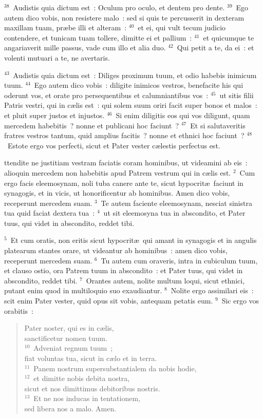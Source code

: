 ${}^{38}$~Audistis quia dictum est~: Oculum pro oculo, et dentem pro dente.
${}^{39}$~Ego autem dico vobis, non resistere malo~: sed si quis te percusserit in dexteram maxillam tuam, pr\ae be illi et alteram~:
${}^{40}$~et ei, qui vult tecum judicio contendere, et tunicam tuam tollere, dimitte ei et pallium~:
${}^{41}$~et quicumque te angariaverit mille passus, vade cum illo et alia duo.
${}^{42}$~Qui petit a te, da ei~: et volenti mutuari a te, ne avertaris.


${}^{43}$~Audistis quia dictum est~: Diliges proximum tuum, et odio habebis inimicum tuum.
${}^{44}$~Ego autem dico vobis~: diligite inimicos vestros, benefacite his qui oderunt vos, et orate pro persequentibus et calumniantibus vos~:
${}^{45}$~ut sitis filii Patris vestri, qui in c\ae lis est~: qui solem suum oriri facit super bonos et malos~: et pluit super justos et injustos.
${}^{46}$~Si enim diligitis eos qui vos diligunt, quam mercedem habebitis~? nonne et publicani hoc faciunt~?
${}^{47}$~Et si salutaveritis fratres vestros tantum, quid amplius facitis~? nonne et ethnici hoc faciunt~?
${}^{48}$~Estote ergo vos perfecti, sicut et Pater vester c\ae lestis perfectus est.

\bchapter
{}ttendite ne justitiam vestram faciatis coram hominibus, ut videamini ab eis~: alioquin mercedem non habebitis apud Patrem vestrum qui in c\ae lis est.
${}^{2}$~Cum ergo facis eleemosynam, noli tuba canere ante te, sicut hypocrit\ae\ faciunt in synagogis, et in vicis, ut honorificentur ab hominibus. Amen dico vobis, receperunt mercedem suam.
${}^{3}$~Te autem faciente eleemosynam, nesciat sinistra tua quid faciat dextera tua~:
${}^{4}$~ut sit eleemosyna tua in abscondito, et Pater tuus, qui videt in abscondito, reddet tibi.


${}^{5}$~Et cum oratis, non eritis sicut hypocrit\ae\ qui amant in synagogis et in angulis platearum stantes orare, ut videantur ab hominibus~: amen dico vobis, receperunt mercedem suam.
${}^{6}$~Tu autem cum oraveris, intra in cubiculum tuum, et clauso ostio, ora Patrem tuum in abscondito~: et Pater tuus, qui videt in abscondito, reddet tibi.
${}^{7}$~Orantes autem, nolite multum loqui, sicut ethnici, putant enim quod in multiloquio suo exaudiantur.
${}^{8}$~Nolite ergo assimilari eis~: scit enim Pater vester, quid opus sit vobis, antequam petatis eum.
${}^{9}$~Sic ergo vos orabitis~: \begin{flushleft}\begin{verse}Pater noster, qui es in c\ae lis,\\ sanctificetur nomen tuum.\\
${}^{10}$~Adveniat regnum tuum~;\\ fiat voluntas tua, sicut in c\ae lo et in terra.\\
${}^{11}$~Panem nostrum supersubstantialem da nobis hodie,\\
${}^{12}$~et dimitte nobis debita nostra,\\ sicut et nos dimittimus debitoribus nostris.\\
${}^{13}$~Et ne nos inducas in tentationem,\\ sed libera nos a malo. Amen.\end{verse}\end{flushleft}


